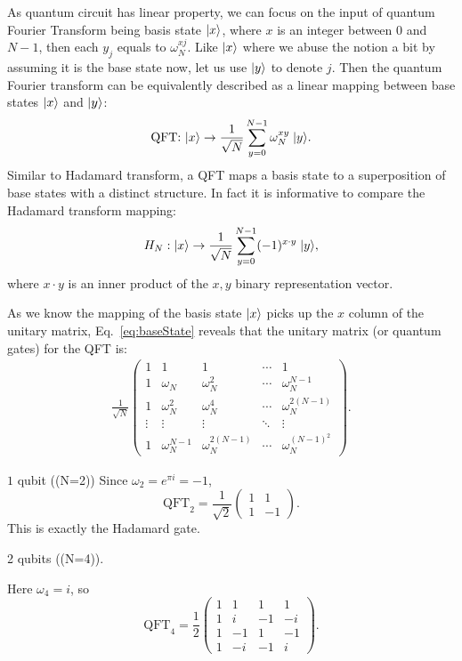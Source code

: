 As quantum circuit has linear property, we can focus on the input of quantum Fourier Transform being basis state \(\lvert x\rangle\), where \(x\) is an integer between \(0\) and \(N-1\), then each \(y_j\) equals to \(\omega_N^{xj}\). Like \(\lvert x\rangle\) where we abuse the notion a bit by assuming it is the base state now, let us use \(\lvert y\rangle\) to denote \(j\). Then the quantum Fourier transform can be equivalently described as a linear mapping between base states \(\lvert x\rangle\) and \(\lvert y\rangle\):
\begin{align}
    \mbox{QFT: } \lvert x\rangle \rightarrow \frac{1}{\sqrt{N}} \sum_{y=0}^{N-1} \omega_{N}^{xy} \; \lvert y\rangle.
    \label{eq:baseState}
\end{align}
Similar to Hadamard transform, a QFT maps a basis state to a superposition of base states with a distinct structure. In fact it is informative to compare the Hadamard transform mapping:
\begin{align*}
    H_N: \lvert x\rangle \rightarrow \frac{1}{\sqrt{N}} \sum_{y=0}^{N-1} (-1)^{x \cdot y} \; \lvert y\rangle,
\end{align*}
where \(x\cdot y\) is an inner product of the \(x, y\) binary representation vector.

As we know the mapping of the basis state \(\lvert x\rangle\) picks up the \(x\) column of the unitary matrix, Eq.~\ref{eq:baseState} reveals that the unitary matrix (or quantum gates) for the QFT is: 
\begin{align}
\frac{1}{\sqrt{N}}
\begin{pmatrix}
1 & 1 & 1 & \cdots & 1 \\
1 & \omega_N & \omega_N^2 & \cdots & \omega_N^{N-1} \\
1 & \omega_N^2 & \omega_N^4 & \cdots & \omega_N^{2(N-1)} \\
\vdots & \vdots & \vdots & \ddots & \vdots \\
1 & \omega_N^{N-1} & \omega_N^{2(N-1)} & \cdots & \omega_N^{(N-1)^2}
\end{pmatrix}.    
\label{eq:QFT}
\end{align}

\begin{example} \(1\) qubit ((N=2))
Since \(\omega_2=e^{\pi i}=-1\),
\[\mbox{QFT}_2 = 
\frac{1}{\sqrt{2}}
\begin{pmatrix}
1 & 1\\
1 & -1
\end{pmatrix}.
\]
This is exactly the Hadamard gate.
\end{example}


\begin{example}
2 qubits ((N=4)).

Here \(\omega_4=i\), so
\[ \mbox{QFT}_4 = 
\frac{1}{2}
\begin{pmatrix}
1 & 1 & 1 & 1\\
1 & i & -1 & -i\\
1 & -1 & 1 & -1\\
1 & -i & -1 & i
\end{pmatrix}.
\]
\end{example}


